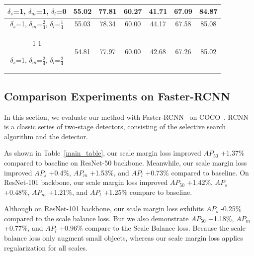 \documentclass{article}
\begin{document}
\begin{table}[!hbpt]
\begin{center}
{\begin{tabular}{c|c|c|c|c|c|c}
            $\delta_{s}$=1, $\delta_{m}$=1, $\delta_{l}$=0 & 55.02 & 77.81 & 60.27 & 41.71 & 67.09 & 84.87 \\ %

            \midrule
            \midrule

            $\delta_{s}$=1, $\delta_{m}$=$\frac{2}{4}$, $\delta_{l}$=$\frac{1}{4}$ & 55.03 & 78.34 & 60.00 & 44.17 & 67.58 & 85.08 \\ \cline{1-1}

            $\delta_{s}$=1, $\delta_{m}$=$\frac{2}{4}$, $\delta_{l}$=$\frac{2}{4}$ & 54.81 & 77.97 & 60.00 & 42.68 & 67.26 & 85.02 \\

            \bottomrule
		\end{tabular}}
	\label{yolo-abl-param}
\end{center}
\end{table}

\subsection{Comparison Experiments on Faster-RCNN}
\label{section_4_2}


In this section, we evaluate our method with Faster-RCNN~\cite{ren2016faster} on COCO~\cite{lin2014microsoft}. RCNN is a classic series of two-stage detectors, consisting of the selective search algorithm and the detector.


As shown in Table~\ref{main_table}, our scale margin loss improved $AP_{50}$ +1.37\% compared to baseline on ResNet-50 backbone. Meanwhile, our scale margin loss improved $AP_{s}$ +0.4\%, $AP_{m}$ +1.53\%, and $AP_{l}$ +0.73\% compared to baseline. On ResNet-101 backbone, our scale margin loss improved $AP_{50}$ +1.42\%, $AP_{s}$ +0.48\%, $AP_{m}$ +1.21\%, and $AP_{l}$ +1.25\% compare to baseline.

Although on ResNet-101 backbone, our scale margin loss exhibits $AP_{s}$ -0.25\% compared to the scale balance loss. But we also demonstrate $AP_{50}$ +1.18\%, $AP_{m}$ +0.77\%, and $AP_{l}$ +0.96\% compare to the Scale Balance loss. Because the scale balance loss only augment small objects, whereas our scale margin loss applies regularization for all scales.
\end{document}
